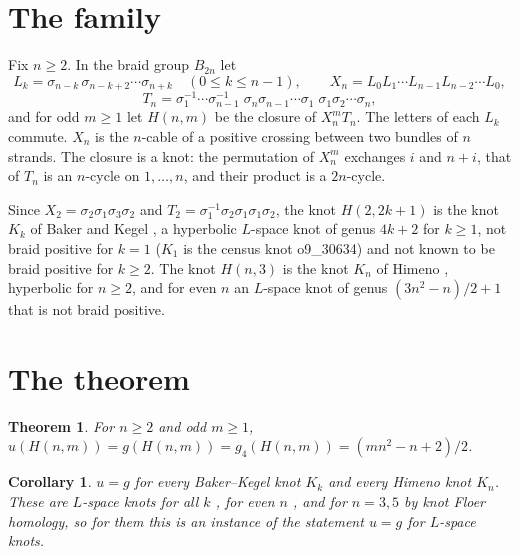 \documentclass[11pt]{article}
\newtheorem{theorem}{Theorem}
\newtheorem{corollary}{Corollary}
\begin{document}
\section{The family}

Fix $n \ge 2$. In the braid group $B_{2n}$ let
\[ L_k = \sigma_{n-k}\,\sigma_{n-k+2}\cdots\sigma_{n+k} \quad (0 \le k \le n-1), \qquad
   X_n = L_0 L_1 \cdots L_{n-1} L_{n-2} \cdots L_0, \]
\[ T_n = \sigma_1^{-1}\cdots\sigma_{n-1}^{-1}\;\sigma_n\sigma_{n-1}\cdots\sigma_1\;\sigma_1\sigma_2\cdots\sigma_n, \]
and for odd $m \ge 1$ let $H(n,m)$ be the closure of $X_n^m T_n$. The letters of each $L_k$ commute. $X_n$ is the
$n$-cable of a positive crossing between two bundles of $n$ strands. The closure is a knot: the permutation of $X_n^m$
exchanges $i$ and $n+i$, that of $T_n$ is an $n$-cycle on $1, \dots, n$, and their product is a $2n$-cycle.

Since $X_2 = \sigma_2\sigma_1\sigma_3\sigma_2$ and $T_2 = \sigma_1^{-1}\sigma_2\sigma_1\sigma_1\sigma_2$, the knot
$H(2,2k+1)$ is the knot $K_k$ of Baker and Kegel \cite{BK}, a hyperbolic $L$-space knot of genus $4k+2$ for $k \ge 1$,
not braid positive for $k = 1$ ($K_1$ is the census knot o9\_30634) and not known to be braid positive for $k \ge 2$.
The knot $H(n,3)$ is the knot $K_n$ of Himeno \cite{Himeno}, hyperbolic for $n \ge 2$, and for even $n$ an $L$-space
knot of genus $(3n^2-n)/2+1$ that is not braid positive.

\section{The theorem}

\begin{theorem}\label{thm}
For $n \ge 2$ and odd $m \ge 1$, \quad $u(H(n,m)) = g(H(n,m)) = g_4(H(n,m)) = (mn^2-n+2)/2$.
\end{theorem}

\begin{corollary}
$u = g$ for every Baker--Kegel knot $K_k$ and every Himeno knot $K_n$. These are $L$-space knots for all $k$
\cite{BK}, for even $n$ \cite{Himeno}, and for $n = 3, 5$ by knot Floer homology, so for them this is an instance of
the statement $u = g$ for $L$-space knots.
\end{corollary}
\end{document}
